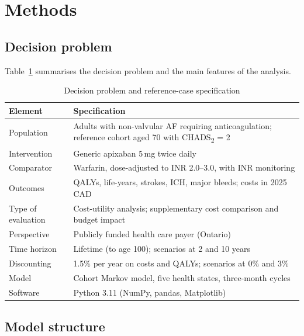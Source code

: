 \documentclass[11pt,letterpaper]{article}
\begin{document}
\section{Methods}

\subsection{Decision problem}

Table~\ref{tab:pico} summarises the decision problem and the main features of the analysis.

\begin{table}[H]
\centering
\caption{Decision problem and reference-case specification}
\label{tab:pico}
\small
\begin{tabularx}{\textwidth}{@{}lX@{}}
\toprule
Element & Specification \\
\midrule
Population & Adults with non-valvular AF requiring anticoagulation; reference cohort aged 70 with
             CHADS\textsubscript{2} = 2 \\
Intervention & Generic apixaban 5\,mg twice daily \\
Comparator & Warfarin, dose-adjusted to INR 2.0--3.0, with INR monitoring \\
Outcomes & QALYs, life-years, strokes, ICH, major bleeds; costs in 2025 CAD \\
Type of evaluation & Cost-utility analysis; supplementary cost comparison and budget impact \\
Perspective & Publicly funded health care payer (Ontario) \\
Time horizon & Lifetime (to age 100); scenarios at 2 and 10 years \\
Discounting & 1.5\% per year on costs and QALYs; scenarios at 0\% and 3\% \\
Model & Cohort Markov model, five health states, three-month cycles \\
Software & Python 3.11 (NumPy, pandas, Matplotlib) \\
\bottomrule
\end{tabularx}
\end{table}

\subsection{Model structure}
\end{document}
